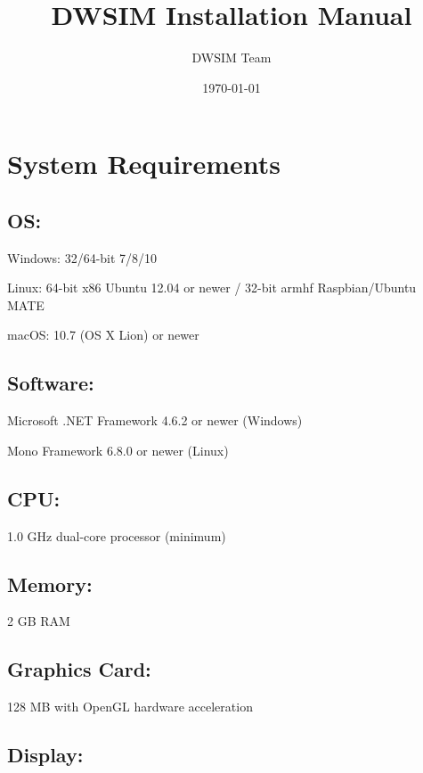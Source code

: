 \documentclass[12pt,a4paper]{article}
\begin{document}
\title{DWSIM Installation Manual}
\author{DWSIM Team}
\date{\today}

\maketitle

\section*{System Requirements}

\subsection*{OS:}

Windows: 32/64-bit 7/8/10

\noindent Linux: 64-bit x86 Ubuntu 12.04 or newer / 32-bit armhf Raspbian/Ubuntu MATE

\noindent macOS: 10.7 (OS X Lion) or newer

\subsection*{Software:}

Microsoft .NET Framework 4.6.2 or newer (Windows) 

\noindent Mono Framework 6.8.0 or newer (Linux)

\subsection*{CPU:}
1.0 GHz dual-core processor (minimum)

\subsection*{Memory:}         

2 GB RAM

\subsection*{Graphics Card:}	

128 MB with OpenGL hardware acceleration

\subsection*{Display:}    
\end{document}
